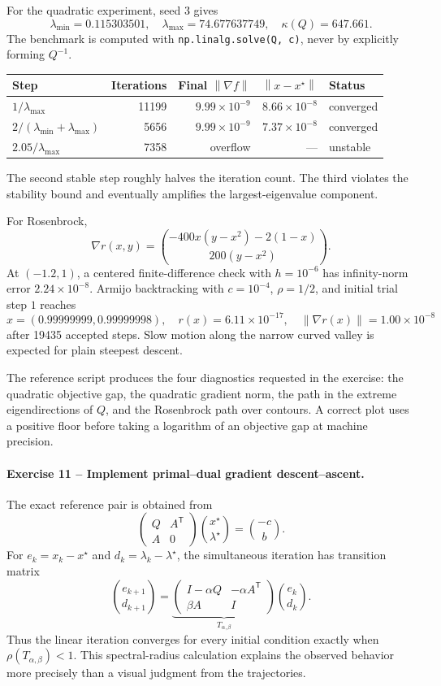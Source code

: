\documentclass[10pt]{article}
\newcommand{\trans}{^{\mathsf T}}
\newcommand{\norm}[1]{\left\lVert#1\right\rVert}
\begin{document}
For the quadratic experiment, seed \(3\) gives
\[
\lambda_{\min}=0.115303501,
\quad \lambda_{\max}=74.677637749,
\quad \kappa(Q)=647.661.
\]
The benchmark is computed with
\texttt{np.linalg.solve(Q, c)}, never by explicitly forming \(Q^{-1}\).

\begin{center}
\begin{tabular}{lrrrl}
\toprule
Step & Iterations & Final \(\norm{\nabla f}\) & \(\norm{x-x^\star}\) & Status\\
\midrule
\(1/\lambda_{\max}\) & 11199 & \(9.99\times10^{-9}\) & \(8.66\times10^{-8}\) & converged\\
\(2/(\lambda_{\min}+\lambda_{\max})\) & 5656 & \(9.99\times10^{-9}\) & \(7.37\times10^{-8}\) & converged\\
\(2.05/\lambda_{\max}\) & 7358 & overflow & --- & unstable\\
\bottomrule
\end{tabular}
\end{center}
The second stable step roughly halves the iteration count. The third violates
the stability bound and eventually amplifies the largest-eigenvalue component.

For Rosenbrock,
\[
\nabla r(x,y)=
\binom{-400x(y-x^2)-2(1-x)}{200(y-x^2)}.
\]
At \((-1.2,1)\), a centered finite-difference check with \(h=10^{-6}\) has
infinity-norm error \(2.24\times10^{-8}\). Armijo backtracking with
\(c=10^{-4}\), \(\rho=1/2\), and initial trial step \(1\) reaches
\[
x=(0.99999999,0.99999998),
\quad r(x)=6.11\times10^{-17},
\quad \norm{\nabla r(x)}=1.00\times10^{-8}
\]
after 19435 accepted steps. Slow motion along the narrow curved valley is
expected for plain steepest descent.

The reference script produces the four diagnostics requested in the exercise:
the quadratic objective gap, the quadratic gradient norm, the path in the
extreme eigendirections of \(Q\), and the Rosenbrock path over contours. A
correct plot uses a positive floor before taking a logarithm of an objective
gap at machine precision.

\paragraph{Exercise 11 -- Implement primal--dual gradient descent--ascent.}

The exact reference pair is obtained from
\[
\begin{pmatrix}Q&A\trans\\A&0\end{pmatrix}
\binom{x^\star}{\lambda^\star}=\binom{-c}{b}.
\]
For \(e_k=x_k-x^\star\) and \(d_k=\lambda_k-\lambda^\star\), the simultaneous
iteration has transition matrix
\[
\binom{e_{k+1}}{d_{k+1}}
=
\underbrace{\begin{pmatrix}
I-\alpha Q&-\alpha A\trans\\
\beta A&I
\end{pmatrix}}_{T_{\alpha,\beta}}
\binom{e_k}{d_k}.
\]
Thus the linear iteration converges for every initial condition exactly when
\(\rho(T_{\alpha,\beta})<1\). This spectral-radius calculation explains the
observed behavior more precisely than a visual judgment from the trajectories.
\end{document}
